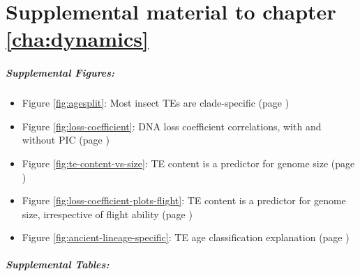 \chapter{Supplemental material to chapter \ref{cha:dynamics}}

\paragraph{Supplemental Figures:}

\begin{itemize}
	\item Figure \ref{fig:agesplit}: Most insect TEs are clade-specific (page \pageref{fig:agesplit})
	\item Figure \ref{fig:loss-coefficient}: DNA loss coefficient correlations, with and without PIC (page \pageref{fig:loss-coefficient})
	\item Figure \ref{fig:te-content-vs-size}: TE content is a predictor for genome size (page \pageref{fig:te-content-vs-size})
	\item Figure \ref{fig:loss-coefficient-plots-flight}: TE content is a predictor for genome size, irrespective of flight ability (page \pageref{fig:loss-coefficient-plots-flight})
	\item Figure \ref{fig:ancient-lineage-specific}: TE age classification explanation (page \pageref{fig:ancient-lineage-specific})
\end{itemize}

\paragraph{Supplemental Tables:}

